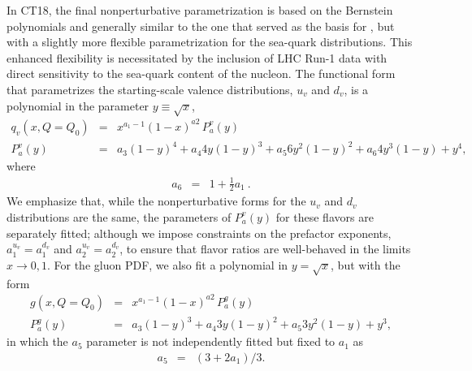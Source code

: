 In CT18, the final nonperturbative parametrization is based on the Bernstein polynomials and generally similar to the one
that served as the basis for \CTHERAII, but with a slightly more flexible parametrization
for the sea-quark distributions. This enhanced flexibility is necessitated by the inclusion
of LHC Run-1 data with direct sensitivity to the sea-quark
content of the nucleon.
%
The functional form that parametrizes the starting-scale valence distributions, $u_v$ and $d_v$, is a polynomial in the
parameter $y\! \equiv\! \sqrt{x}$,
%
\begin{eqnarray}
\label{eq:v_param}
q_v(x,Q=Q_0) &=& x^{a_1-1}(1-x)^{a2}\,P^v_a(y) \\
P^v_a(y) &=& a_3         (1-y)^4 + 
a_4   4 y   (1-y)^3 + 
a_5   6 y^2 (1-y)^2 + 
a_6   4 y^3 (1-y)   + 
y^4,             \nonumber 
\end{eqnarray}
where
\begin{eqnarray}
a_6 &=& 1 + \frac{1}{2} a_1\ .
\end{eqnarray}
%
We emphasize that, while the nonperturbative forms for the
$u_v$ and $d_v$ distributions are the same, the parameters of $P^v_a(y)$ 
for these flavors are separately fitted; although we impose
constraints on the prefactor exponents, $a^{u_v}_1\! =\! a^{d_v}_1$ and
$a^{u_v}_2\! =\! a^{d_v}_2$, to ensure that flavor ratios are well-behaved
in the limits $x\! \to\! 0,1$.
%
%
%
%
%
%
%
%
For the gluon PDF, we also fit a polynomial in $y\! =\! \sqrt{x}$,
but with the form
%
\begin{eqnarray}
g(x,Q=Q_0) &=& x^{a_1-1}(1-x)^{a2}\,P^g_a(y) \\
P^g_a(y) &=& a_3         (1-y)^3 + 
a_4   3 y   (1-y)^2 + 
a_5   3 y^2 (1-y)   + 
y^3, \nonumber
\end{eqnarray}
%
in which the $a_5$ parameter is not independently fitted but fixed to $a_1$ as
%
\begin{eqnarray}
a_5 &=& ( 3 + 2 a_1 ) \big/ 3.
\end{eqnarray}
